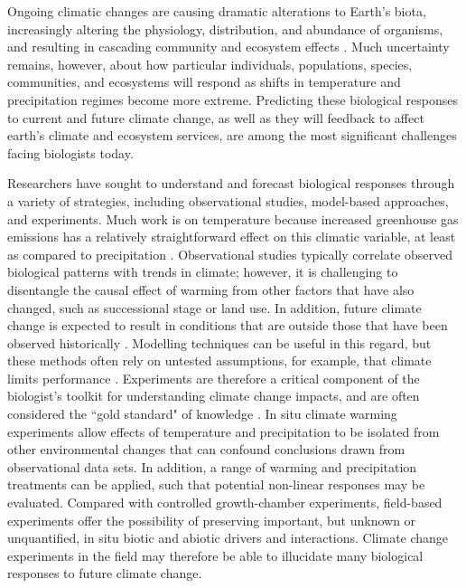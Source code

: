 \documentclass{article}
\begin{document}
\par Ongoing climatic changes are causing dramatic alterations to Earth's biota, increasingly altering the physiology, distribution, and abundance of organisms, and resulting in cascading community and ecosystem effects \citep{shukla1982,cox2000,thomas2004,parmesan2006,field2007,sheldon2011,urban2012}.  Much uncertainty remains, however, about how particular individuals, populations, species, communities, and ecosystems will respond as shifts in temperature and precipitation regimes become more extreme. Predicting these biological responses to current and future climate change, as well as they will feedback to affect earth's climate and ecosystem services, are among the most significant challenges facing biologists today.
\par Researchers have sought to understand and forecast biological responses through a variety of strategies, including observational studies, model-based approaches, and experiments. Much work is on temperature because increased greenhouse gas emissions has a relatively straightforward effect on this climatic variable, at least as compared to precipitation \citep{ipcc2013}. Observational studies typically correlate observed biological patterns with trends in climate; however, it is challenging to disentangle the causal effect of warming from other factors that have also changed, such as successional stage or land use. In addition, future climate change is expected to result in conditions that are outside those that have been observed historically \citep{ohlemuller2006,williams2007,williams2007b,ipcc2013}. Modelling techniques can be useful in this regard, but these methods often rely on untested assumptions, for example, that climate limits performance \citep{pearson2004,ibanez2006,swab2012}. Experiments are therefore a critical component of the biologist's toolkit for understanding climate change impacts, and are often considered the ``gold standard" of knowledge \citep[e.g.][]{box1978,gelman2014}. In situ climate warming experiments allow effects of temperature and  precipitation to be isolated from other  environmental changes that can confound conclusions drawn from observational data sets. In addition, a range of warming  and precipitation treatments can be applied, such that potential non-linear responses may be evaluated. Compared with controlled growth-chamber experiments, field-based experiments offer the possibility of preserving important, but unknown or unquantified, in situ biotic and abiotic drivers and interactions. Climate change experiments in the field may therefore be able to illucidate many biological responses to future climate change.
\end{document}
